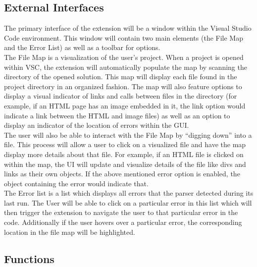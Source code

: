 \documentclass[letterpaper,10pt,titlepage,draftclsnofoot,onecolumn,onesided] {IEEEtran}
\begin{document}
\subsection{External Interfaces}
The primary interface of the extension will be a window within the Visual Studio Code environment. This window will contain two main elements (the File Map and the Error List) as well as a toolbar for options.
\\
The File Map is a visualization of the user's project. When a project is opened within VSC, the extension will automatically populate the map by scanning the directory of the opened solution. This map will display each file found in the project directory in an organized fashion. The map will also feature options to display a visual indicator of links and calls between files in the directory (for example, if an HTML page has an image embedded in it, the link option would indicate a link between the HTML and image files) as well as an option to display an indicator of the location of errors within the GUI.
\\
The user will also be able to interact with the File Map by “digging down” into a file. This process will allow a user to click on a visualized file and have the map display more details about that file. For example, if an HTML file is clicked on within the map, the UI will update and visualize details of the file like divs and links as their own objects. If the above mentioned error option is enabled, the object containing the error would indicate that.
\\
The Error list is a list which displays all errors that the parser detected during its last run. The User will be able to click on a particular error in this list which will then trigger the extension to navigate the user to that particular error in the code. Additionally if the user hovers over a particular error, the corresponding location in the file map will be highlighted.

\subsection{Functions}
\end{document}
